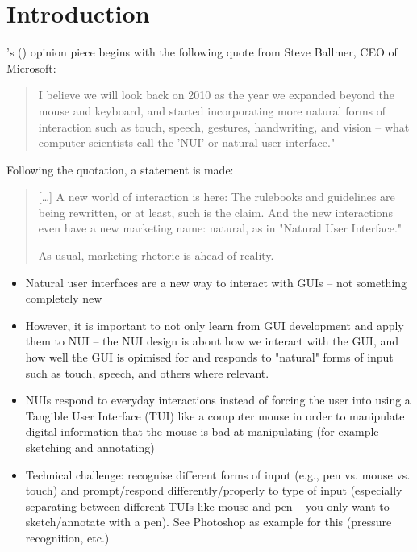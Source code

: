 \section{Introduction}

\citeauthor{norman:natural-user-interfaces-are-not-natural:2010}'s (\citeyear{norman:natural-user-interfaces-are-not-natural:2010}) opinion piece  begins with the following quote from Steve Ballmer, CEO of Microsoft:

\begin{quote}
I believe we will look back on 2010 as the year we expanded beyond the mouse and keyboard, and started incorporating more natural forms of interaction such as touch, speech, gestures, handwriting, and vision -- what computer scientists call the 'NUI' or natural user interface."
\end{quote}


Following the quotation, a statement is made:

\begin{quotation}
[\dots] A new world of interaction is here: The rulebooks and guidelines are being rewritten, or at least, such is the claim. And the new interactions even have a new marketing name: natural, as in "Natural User Interface."

As usual, marketing rhetoric is ahead of reality.    
\end{quotation}

\begin{itemize}
  \item Natural user interfaces are a new way to interact with GUIs -- not something completely new
  \item However, it is important to not only learn from GUI development and apply them to NUI -- the NUI design is about how we interact with the GUI, and how well the GUI is opimised for and responds to "natural" forms of input such as touch, speech, and others where relevant.
  \item NUIs respond to everyday interactions instead of forcing the user into using a Tangible User Interface (TUI) like a computer mouse in order to manipulate digital information that the mouse is bad at manipulating (for example sketching and annotating)
  \item Technical challenge: recognise different forms of input (e.g., pen vs. mouse vs. touch) and prompt/respond differently/properly to type of input (especially separating between different TUIs like mouse and pen -- you only want to sketch/annotate with a pen). See Photoshop as example for this (pressure recognition, etc.)
\end{itemize}

